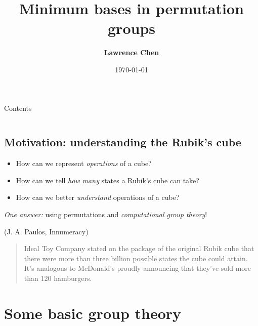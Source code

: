 \documentclass{beamer}
\title{\textbf{Minimum bases in permutation groups}}
\author{\textbf{Lawrence Chen}}
\institute{\textbf{Honours presentation}}
\date{\today}
\begin{document}
\begin{frame}
    \titlepage
\end{frame}

\begin{frame}{Contents}
    \begin{columns}[t]
        \begin{column}{.5\textwidth}
            \tableofcontents[sections={1-2}]
        \end{column}
        \begin{column}{.5\textwidth}
            \tableofcontents[sections={3-4}]
        \end{column}
    \end{columns}
\end{frame}

\subsection{Motivation: understanding the Rubik's cube}

\begin{slide}
    \begin{itemize}
        \item How can we represent \textit{operations} of a cube? \pause
        \item How can we tell \textit{how many} states a Rubik's cube can take? \pause
        \item How can we better \textit{understand} operations of a cube? \pause
    \end{itemize}

    \textit{One answer:} using permutations and \textit{computational group theory}! \pause

    \begin{alertblock}{(J. A. Paulos, Innumeracy)}
        \vspace{4pt}
        \begin{quotation}
            Ideal Toy Company stated on the package of the original Rubik cube that there were more than three billion possible states the cube could attain. It's analogous to McDonald's proudly announcing that they've sold more than 120 hamburgers.
        \end{quotation}
    \end{alertblock}
\end{slide}

\section{Some basic group theory}
\end{document}
